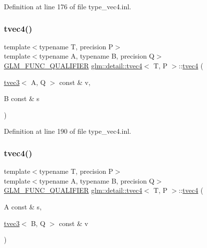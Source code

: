 Definition at line 176 of file type\+\_\+vec4.\+inl.

\mbox{\label{structglm_1_1detail_1_1tvec4_acdd7a9ea34155ac8f12b5959e599206b}} 
\subsubsection{\texorpdfstring{tvec4()}{tvec4()}\hspace{0.1cm}{\footnotesize\ttfamily [21/23]}}
{\footnotesize\ttfamily template$<$typename T, precision P$>$ \\
template$<$typename A, typename B, precision Q$>$ \\
\hyperlink{setup_8hpp_a33fdea6f91c5f834105f7415e2a64407}{G\+L\+M\+\_\+\+F\+U\+N\+C\+\_\+\+Q\+U\+A\+L\+I\+F\+I\+ER} \hyperlink{structglm_1_1detail_1_1tvec4}{glm\+::detail\+::tvec4}$<$ T, P $>$\+::\hyperlink{structglm_1_1detail_1_1tvec4}{tvec4} (\begin{DoxyParamCaption}\item[{\hyperlink{structglm_1_1detail_1_1tvec3}{tvec3}$<$ A, Q $>$ const \&}]{v,  }\item[{B const \&}]{s }\end{DoxyParamCaption})}



Definition at line 190 of file type\+\_\+vec4.\+inl.

\mbox{\label{structglm_1_1detail_1_1tvec4_aea55658ec0e7bb02b83a8cc618de125c}} 
\subsubsection{\texorpdfstring{tvec4()}{tvec4()}\hspace{0.1cm}{\footnotesize\ttfamily [22/23]}}
{\footnotesize\ttfamily template$<$typename T, precision P$>$ \\
template$<$typename A, typename B, precision Q$>$ \\
\hyperlink{setup_8hpp_a33fdea6f91c5f834105f7415e2a64407}{G\+L\+M\+\_\+\+F\+U\+N\+C\+\_\+\+Q\+U\+A\+L\+I\+F\+I\+ER} \hyperlink{structglm_1_1detail_1_1tvec4}{glm\+::detail\+::tvec4}$<$ T, P $>$\+::\hyperlink{structglm_1_1detail_1_1tvec4}{tvec4} (\begin{DoxyParamCaption}\item[{A const \&}]{s,  }\item[{\hyperlink{structglm_1_1detail_1_1tvec3}{tvec3}$<$ B, Q $>$ const \&}]{v }\end{DoxyParamCaption})}



